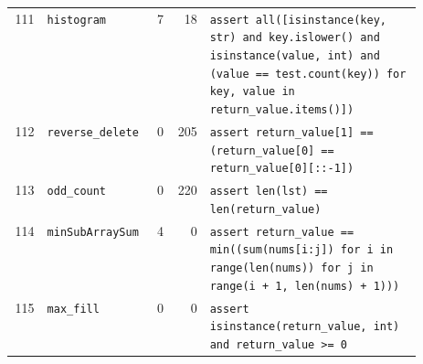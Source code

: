 \begin{footnotesize}
\begin{longtable}{@{}r l r r p{0.52\linewidth}@{}}
111 & \texttt{histogram} & 7 & 18 & \texttt{assert \allowbreak{}all(\allowbreak{}[\allowbreak{}isinstance(\allowbreak{}key,\allowbreak{} \allowbreak{}str)\allowbreak{} \allowbreak{}and \allowbreak{}key.\allowbreak{}islower(\allowbreak{})\allowbreak{} \allowbreak{}and \allowbreak{}isinstance(\allowbreak{}value,\allowbreak{} \allowbreak{}int)\allowbreak{} \allowbreak{}and \allowbreak{}(\allowbreak{}value \allowbreak{}=\allowbreak{}=\allowbreak{} \allowbreak{}test.\allowbreak{}count(\allowbreak{}key)\allowbreak{})\allowbreak{} \allowbreak{}for \allowbreak{}key,\allowbreak{} \allowbreak{}value \allowbreak{}in \allowbreak{}return\_value.\allowbreak{}items(\allowbreak{})\allowbreak{}]\allowbreak{})\allowbreak{}} \\
112 & \texttt{reverse\_delete} & 0 & 205 & \texttt{assert \allowbreak{}return\_value[\allowbreak{}1]\allowbreak{} \allowbreak{}=\allowbreak{}=\allowbreak{} \allowbreak{}(\allowbreak{}return\_value[\allowbreak{}0]\allowbreak{} \allowbreak{}=\allowbreak{}=\allowbreak{} \allowbreak{}return\_value[\allowbreak{}0]\allowbreak{}[\allowbreak{}:\allowbreak{}:\allowbreak{}-\allowbreak{}1]\allowbreak{})\allowbreak{}} \\
113 & \texttt{odd\_count} & 0 & 220 & \texttt{assert \allowbreak{}len(\allowbreak{}lst)\allowbreak{} \allowbreak{}=\allowbreak{}=\allowbreak{} \allowbreak{}len(\allowbreak{}return\_value)\allowbreak{}} \\
114 & \texttt{minSubArraySum} & 4 & 0 & \texttt{assert \allowbreak{}return\_value \allowbreak{}=\allowbreak{}=\allowbreak{} \allowbreak{}min(\allowbreak{}(\allowbreak{}sum(\allowbreak{}nums[\allowbreak{}i:\allowbreak{}j]\allowbreak{})\allowbreak{} \allowbreak{}for \allowbreak{}i \allowbreak{}in \allowbreak{}range(\allowbreak{}len(\allowbreak{}nums)\allowbreak{})\allowbreak{} \allowbreak{}for \allowbreak{}j \allowbreak{}in \allowbreak{}range(\allowbreak{}i \allowbreak{}+\allowbreak{} \allowbreak{}1,\allowbreak{} \allowbreak{}len(\allowbreak{}nums)\allowbreak{} \allowbreak{}+\allowbreak{} \allowbreak{}1)\allowbreak{})\allowbreak{})\allowbreak{}} \\
115 & \texttt{max\_fill} & 0 & 0 & \texttt{assert \allowbreak{}isinstance(\allowbreak{}return\_value,\allowbreak{} \allowbreak{}int)\allowbreak{} \allowbreak{}and \allowbreak{}return\_value \allowbreak{}>\allowbreak{}=\allowbreak{} \allowbreak{}0} \\

\end{longtable}
\end{footnotesize}
